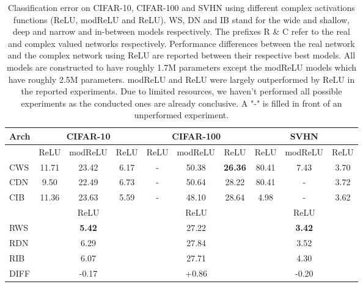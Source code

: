 \documentclass{article}
\begin{document}
\begin{table}[t]
\vskip 0.15in
\begin{center}
\caption{Classification error on CIFAR-10, CIFAR-100 and SVHN using different complex activations functions (ReLU, modReLU and ReLU). WS, DN and IB stand for the wide and shallow, deep and narrow and in-between models respectively. The prefixes R \& C refer to the real and complex valued networks respectively. Performance differences between the real network and the complex network using ReLU are reported between their respective best models. All models are constructed to have roughly 1.7M parameters except the modReLU models which have roughly 2.5M parameters. modReLU and ReLU were largely outperformed by ReLU in the reported experiments. Due to  limited resources, we haven't performed all possible experiments as the conducted ones are already conclusive. A "-" is filled in front of an unperformed experiment.}
\label{results_activation}
\begin{small}
\begin{sc}
\begin{tabular}{l|ccc|ccc|ccc}
\toprule
Arch & \multicolumn{3}{c|}{CIFAR-10} & \multicolumn{3}{c|}{CIFAR-100} & \multicolumn{3}{c}{SVHN} \\
\midrule
& ReLU & \hspace{-4mm} modReLU \hspace{-4mm} & ReLU & ReLU & \hspace{-4mm} modReLU \hspace{-4mm} & ReLU & ReLU & \hspace{-4mm} modReLU \hspace{-4mm} & ReLU\\
\midrule
CWS & 11.71 & 23.42 & 6.17 & - & 50.38 & \textbf{26.36} & 80.41 & 7.43 & 3.70 \\
CDN & 9.50 & 22.49 & 6.73 & - & 50.64 & 28.22 & 80.41 & - & 3.72 \\
CIB & 11.36 & 23.63 & 5.59 & - & 48.10 & 28.64 & 4.98 & - & 3.62\\
\midrule
& \multicolumn{3}{c|}{ReLU} & \multicolumn{3}{c|}{ReLU} & \multicolumn{3}{c}{ReLU} \\
\midrule
RWS & \multicolumn{3}{c|}{\textbf{5.42}} & \multicolumn{3}{c|}{27.22} & \multicolumn{3}{c}{\textbf{3.42}} \\
RDN & \multicolumn{3}{c|}{6.29} & \multicolumn{3}{c|}{27.84} & \multicolumn{3}{c}{3.52} \\
RIB & \multicolumn{3}{c|}{6.07} & \multicolumn{3}{c|}{27.71} & \multicolumn{3}{c}{4.30} \\
\midrule
DIFF & \multicolumn{3}{c|}{-0.17} & \multicolumn{3}{c|}{+0.86} & \multicolumn{3}{c}{-0.20} \\
\bottomrule
\end{tabular}
\end{sc}
\end{small}
\end{center}
\vskip -0.1in
\end{table}
\end{document}

